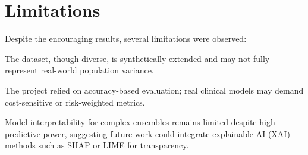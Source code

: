 \section{Limitations}\label{sec:limitations}

Despite the encouraging results, several limitations were observed:

The dataset, though diverse, is synthetically extended and may not fully represent real-world population variance.

The project relied on accuracy-based evaluation; real clinical models may demand cost-sensitive or risk-weighted metrics.

Model interpretability for complex ensembles remains limited despite high predictive power, suggesting future work could integrate explainable AI (XAI) methods such as SHAP or LIME for transparency.